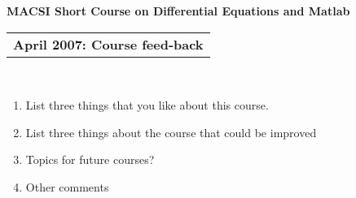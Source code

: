 \documentclass[11pt]{article}
\begin{document}
\begin{center}

\textbf{MACSI Short Course on Differential Equations and Matlab}\\[12pt]

\begin{tabular}{l}
\textbf{April 2007: Course feed-back} \\
\end{tabular}\\[2pt]


\end{center}

\dotfill

\begin{enumerate}
\item List three things that you like  about this course.
\vspace{5cm}

\item List three things about the course that could be improved
\vspace{5cm}



\item Topics for future courses?
\vspace{5cm}



\dotfill

\item Other comments



\end{enumerate}
\end{document}
